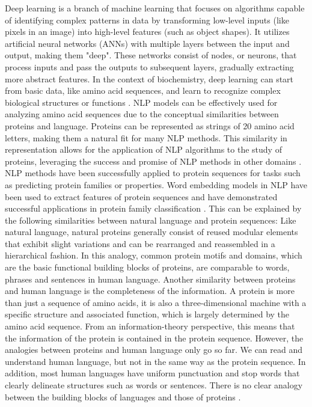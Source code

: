 Deep learning is a branch of machine learning that focuses on algorithms capable of identifying complex patterns in data by transforming low-level inputs (like pixels in an image) into high-level features (such as object shapes). It utilizes artificial neural networks (ANNs) with multiple layers between the input and output, making them "deep". These networks consist of nodes, or neurons, that process inputs and pass the outputs to subsequent layers, gradually extracting more abstract features. In the context of biochemistry, deep learning can start from basic data, like amino acid sequences, and learn to recognize complex biological structures or functions \citep{Graves2020}. NLP models can be effectively used for analyzing amino acid sequences due to the conceptual similarities between proteins and language. Proteins can be represented as strings of 20 amino acid letters, making them a natural fit for many NLP methods. This similarity in representation allows for the application of NLP algorithms to the study of proteins, leveraging the success and promise of NLP methods in other domains \citep{Ofer2021}. NLP methods have been successfully applied to protein sequences for tasks such as predicting protein families or properties. Word embedding models in NLP have been used to extract features of protein sequences and have demonstrated successful applications in protein family classification \citep{Xu2020}. This can be explained by the following similarities between natural language and protein sequences: Like natural language, natural proteins generally consist of reused modular elements that exhibit slight variations and can be rearranged and reassembled in a hierarchical fashion. In this analogy, common protein motifs and domains, which are the basic functional building blocks of proteins, are comparable to words, phrases and sentences in human language. Another similarity between proteins and human language is the completeness of the information. A protein is more than just a sequence of amino acids, it is also a three-dimensional machine with a specific structure and associated function, which is largely determined by the amino acid sequence. From an information-theory perspective, this means that the information of the protein is contained in the protein sequence. However, the analogies between proteins and human language only go so far. We can read and understand human language, but not in the same way as the protein sequence. In addition, most human languages have uniform punctuation and stop words that clearly delineate structures such as words or sentences. There is no clear analogy between the building blocks of languages and those of proteins \citep{Ofer2021}.

